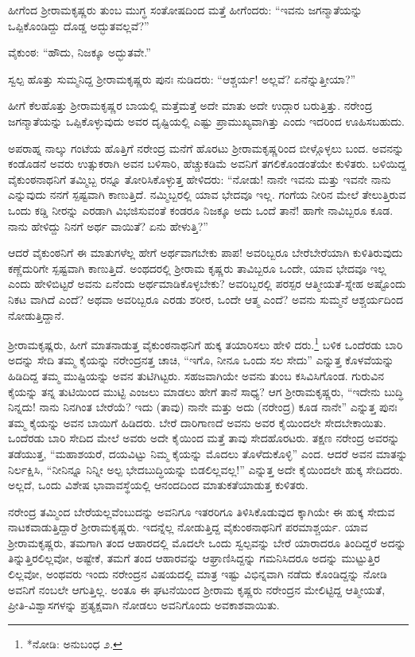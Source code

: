 ಹೀಗೆಂದ ಶ್ರೀರಾಮಕೃಷ್ಣರು ತುಂಬ ಮುಗ್ಧ ಸಂತೋಷದಿಂದ ಮತ್ತೆ ಹೀಗೆಂದರು: “ಇವನು ಜಗನ್ಮಾತೆಯನ್ನು ಒಪ್ಪಿಕೊಂಡಿದ್ದು ದೊಡ್ಡ ಅದ್ಭುತವಲ್ಲವೆ?”

ವೈಕುಂಠ: “ಹೌದು, ನಿಜಕ್ಕೂ ಅದ್ಭುತವೇ.”

ಸ್ವಲ್ಪ ಹೊತ್ತು ಸುಮ್ಮನಿದ್ದ ಶ್ರೀರಾಮಕೃಷ್ಣರು ಪುನಃ ನುಡಿದರು: “ಆಶ್ಚರ್ಯ! ಅಲ್ಲವೆ? ಏನೆನ್ನುತ್ತೀಯಾ?”

ಹೀಗೆ ಕೆಲಹೊತ್ತು ಶ್ರೀರಾಮಕೃಷ್ಣರ ಬಾಯಲ್ಲಿ ಮತ್ತೆಮತ್ತೆ ಅದೇ ಮಾತು ಅದೇ ಉದ್ಗಾರ ಬರುತ್ತಿತ್ತು. ನರೇಂದ್ರ ಜಗನ್ಮಾತೆಯನ್ನು ಒಪ್ಪಿಕೊಳ್ಳುವುದು ಅವರ ದೃಷ್ಟಿಯಲ್ಲಿ ಎಷ್ಟು ಪ್ರಾಮುಖ್ಯವಾಗಿತ್ತು ಎಂದು ಇದರಿಂದ ಊಹಿಸಬಹುದು.

ಅಪರಾಹ್ನ ನಾಲ್ಕು ಗಂಟೆಯ ಹೊತ್ತಿಗೆ ನರೇಂದ್ರ ಮನೆಗೆ ಹೊರಟು ಶ್ರೀರಾಮಕೃಷ್ಣರಿಂದ ಬೀಳ್ಗೊಳ್ಳಲು ಬಂದ. ಅವನನ್ನು ಕಂಡೊಡನೆ ಅವರು ಉತ್ಸುಕರಾಗಿ ಅವನ ಬಳಿಸಾರಿ, ಹೆಚ್ಚುಕಡಿಮೆ ಅವನಿಗೆ ತಗಲಿಕೊಂಡಂತೆಯೇ ಕುಳಿತರು. ಬಳಿಯಿದ್ದ ವೈಕುಂಠನಾಥನಿಗೆ ತಮ್ಮಿಬ್ಬ ರನ್ನೂ ತೋರಿಸಿಕೊಳ್ಳುತ್ತ ಹೇಳಿದರು: “ನೋಡು! ನಾನೇ ಇವನು ಮತ್ತು ಇವನೇ ನಾನು ಎನ್ನುವುದು ನನಗೆ ಸ್ಪಷ್ಟವಾಗಿ ಕಾಣುತ್ತಿದೆ. ನಮ್ಮಿಬ್ಬರಲ್ಲಿ ಯಾವ ಭೇದವೂ ಇಲ್ಲ. ಗಂಗೆಯ ನೀರಿನ ಮೇಲೆ ತೇಲುತ್ತಿರುವ ಒಂದು ಕಡ್ಡಿ ನೀರನ್ನು ಎರಡಾಗಿ ವಿಭಜಿಸುವಂತೆ ಕಂಡರೂ ನಿಜಕ್ಕೂ ಅದು ಒಂದೆ ತಾನೆ! ಹಾಗೇ ನಾವಿಬ್ಬರೂ ಕೂಡ. ನಾನು ಹೇಳಿದ್ದು ನಿನಗೆ ಅರ್ಥ ವಾಯಿತೆ? ಏನು ಹೇಳುತ್ತಿ?”

ಆದರೆ ವೈಕುಂಠನಿಗೆ ಈ ಮಾತುಗಳೆಲ್ಲ ಹೇಗೆ ಅರ್ಥವಾಗಬೇಕು ಪಾಪ! ಅವರಿಬ್ಬರೂ ಬೇರೆಬೇರೆಯಾಗಿ ಕುಳಿತಿರುವುದು ಕಣ್ಣೆದುರಿಗೇ ಸ್ಪಷ್ಟವಾಗಿ ಕಾಣುತ್ತಿದೆ. ಅಂಥದರಲ್ಲಿ ಶ್ರೀರಾಮ ಕೃಷ್ಣರು ತಾವಿಬ್ಬರೂ ಒಂದೇ, ಯಾವ ಭೇದವೂ ಇಲ್ಲ ಎಂದು ಹೇಳಿಬಿಟ್ಟರೆ ಅವನು ಏನೆಂದು ಅರ್ಥಮಾಡಿಕೊಳ್ಳಬೇಕು? ಅವರಿಬ್ಬರಲ್ಲಿ ಪರಸ್ಪರ ಆತ್ಮೀಯತೆ-ಸ್ನೇಹ ಅಷ್ಟೊಂದು ನಿಕಟ ವಾಗಿದೆ ಎಂದೆ? ಅಥವಾ ಅವರಿಬ್ಬರೂ ಎರಡು ಶರೀರ, ಒಂದೇ ಆತ್ಮ ಎಂದೆ? ಅವನು ಸುಮ್ಮನೆ ಆಶ್ಚರ್ಯದಿಂದ ನೋಡುತ್ತಿದ್ದಾನೆ.

ಶ್ರೀರಾಮಕೃಷ್ಣರು, ಹೀಗೆ ಮಾತನಾಡುತ್ತ ವೈಕುಂಠನಾಥನಿಗೆ ಹುಕ್ಕ ತಯಾರಿಸಲು ಹೇಳಿ ದರು.\footnote{*ನೋಡಿ: ಅನುಬಂಧ ೨.} ಬಳಿಕ ಒಂದೆರಡು ಬಾರಿ ಅದನ್ನು ಸೇದಿ ತಮ್ಮ ಕೈಯನ್ನು ನರೇಂದ್ರನತ್ತ ಚಾಚಿ, “ಇಗೊ, ನೀನೂ ಒಂದು ಸಲ ಸೇದು” ಎನ್ನುತ್ತ ಕೊಳವೆಯನ್ನು ಹಿಡಿದಿದ್ದ ತಮ್ಮ ಮುಷ್ಟಿಯನ್ನು ಅವನ ತುಟಿಗಿಟ್ಟರು. ಸಹಜವಾಗಿಯೇ ಅವನು ತುಂಬ ಕಸಿವಿಸಿಗೊಂಡ. ಗುರುವಿನ ಕೈಯನ್ನು ತನ್ನ ತುಟಿಯಿಂದ ಮುಟ್ಟಿ ಎಂಜಲು ಮಾಡಲು ಹೇಗೆ ತಾನೆ ಸಾಧ್ಯ? ಆಗ ಶ್ರೀರಾಮಕೃಷ್ಣರು, “ಇದೇನು ಬುದ್ಧಿ ನಿನ್ನದು! ನಾನು ನಿನಗಿಂತ ಬೇರೆಯೆ? ಇದು (ತಾವು) ನಾನೇ ಮತ್ತು ಅದು (ನರೇಂದ್ರ) ಕೂಡ ನಾನೇ” ಎನ್ನುತ್ತ ಪುನಃ ತಮ್ಮ ಕೈಯನ್ನು ಅವನ ಬಾಯಿಗೆ ಹಿಡಿದರು. ಬೇರೆ ದಾರಿಗಾಣದೆ ಅವನು ಅವರ ಕೈಯಿಂದಲೇ ಸೇದಬೇಕಾಯಿತು. ಒಂದೆರಡು ಬಾರಿ ಸೇದಿದ ಮೇಲೆ ಅವರು ಅದೇ ಕೈಯಿಂದ ಮತ್ತೆ ತಾವು ಸೇದಹೊರಟರು. ತಕ್ಷಣ ನರೇಂದ್ರ ಅವರನ್ನು ತಡೆಯುತ್ತ, “ಮಹಾಶಯರೆ, ದಯವಿಟ್ಟು ನಿಮ್ಮ ಕೈಯನ್ನು ಮೊದಲು ತೊಳೆದುಕೊಳ್ಳಿ” ಎಂದ. ಆದರೆ ಅವನ ಮಾತನ್ನು ನಿರ್ಲಕ್ಷಿಸಿ, “ನೀನಿನ್ನೂ ನಿನ್ನೀ ಅಲ್ಪ ಭೇದಬುದ್ಧಿಯನ್ನು ಬಿಡಲಿಲ್ಲವಲ್ಲ!” ಎನ್ನುತ್ತ ಅದೇ ಕೈಯಿಂದಲೇ ಹುಕ್ಕ ಸೇದಿದರು. ಅಲ್ಲದೆ, ಒಂದು ವಿಶೇಷ ಭಾವಾವಸ್ಥೆಯಲ್ಲಿ ಆನಂದದಿಂದ ಮಾತುಕತೆಯಾಡುತ್ತ ಕುಳಿತರು. 

ನರೇಂದ್ರ ತಮ್ಮಿಂದ ಬೇರೆಯಲ್ಲವೆಂಬುದನ್ನು ಅವನಿಗೂ ಇತರರಿಗೂ ತಿಳಿಸಿಕೊಡುವುದ ಕ್ಕಾಗಿಯೇ ಈ ಹುಕ್ಕ ಸೇದುವ ನಾಟಕವಾಡುತ್ತಿದ್ದಾರೆ ಶ್ರೀರಾಮಕೃಷ್ಣರು. ಇದನ್ನೆಲ್ಲ ನೋಡುತ್ತಿದ್ದ ವೈಕುಂಠನಾಥನಿಗೆ ಪರಮಾಶ್ಚರ್ಯ. ಯಾವ ಶ್ರೀರಾಮಕೃಷ್ಣರು, ತಮಗಾಗಿ ತಂದ ಆಹಾರದಲ್ಲಿ ಮೊದಲೇ ಒಂದು ಸ್ವಲ್ಪವನ್ನು ಬೇರೆ ಯಾರಾದರೂ ತಿಂದಿದ್ದರೆ ಅದನ್ನು ತಿನ್ನುತ್ತಿರಲಿಲ್ಲವೋ, ಅಷ್ಟೇಕೆ, ತಮಗೆ ತಂದ ಆಹಾರವನ್ನು ಆಘ್ರಾಣಿಸಿದ್ದನ್ನು ಗಮನಿಸಿದರೂ ಅದನ್ನು ಮುಟ್ಟುತ್ತಿರ ಲಿಲ್ಲವೋ, ಅಂಥವರು ಇಂದು ನರೇಂದ್ರನ ವಿಷಯದಲ್ಲಿ ಮಾತ್ರ ಇಷ್ಟು ವಿಭಿನ್ನವಾಗಿ ನಡೆದು ಕೊಂಡಿದ್ದನ್ನು ನೋಡಿ ಅವನಿಗೆ ನಂಬಲೇ ಆಗುತ್ತಿಲ್ಲ. ಅಂತೂ ಈ ಘಟನೆಯಿಂದ ಶ್ರೀರಾಮ ಕೃಷ್ಣರು ನರೇಂದ್ರನ ಮೇಲಿಟ್ಟಿದ್ದ ಆತ್ಮೀಯತೆ, ಪ್ರೀತಿ-ವಿಶ್ವಾಸಗಳನ್ನು ಪ್ರತ್ಯಕ್ಷವಾಗಿ ನೋಡಲು ಅವನಿಗೊಂದು ಅವಕಾಶವಾಯಿತು.

